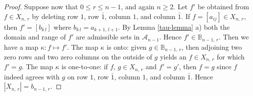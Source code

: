 \documentclass[11pt]{article}
\newcommand{\ges}{\geqslant}
\newcommand{\les}{\leqslant}
\begin{document}
\begin{proof}
Suppose now that $0\les r\les n-1$, and again $n\ges 2$.
Let $f'$ be obtained from $f\in X_{n,\,r}$ by deleting row $1$, row $\bar{1}$, column $1$, and column $\bar{1}$. If $f=[a_{ij}]\in X_{n,\,r}$, then $f'=[b_{k\,l}]$ where $b_{k\,l}=a_{k+1,\,l+1}$.
By Lemma \ref{tau-lemma} a) both the domain and range of $f'$ are admissible sets in $\mathscr A_{n-1}$. Hence $f'\in \mathbb B_{n-1,\,r}$. Then we have a map
$\kappa: f\mapsto f'$. The map $\kappa$ is onto:  given $g\in \mathbb B_{n-1,\,r}$, then adjoining two zero rows and two zero columns on the outside of $g$ yields an $f\in X_{n,\,r}$ for which $f'=g$.
The map $\kappa$ is one-to-one: if $f,\,g\in X_{n,\,r}$ and $f'= g'$, then  $f=g$
since $f$ indeed agrees with $g$ on row  $1$, row $\bar{1}$, column $1$, and column $\bar{1}$. Hence $|X_{n,\,r}|=b_{n-1,\,r}$.
\end{proof}
%
\end{document}
